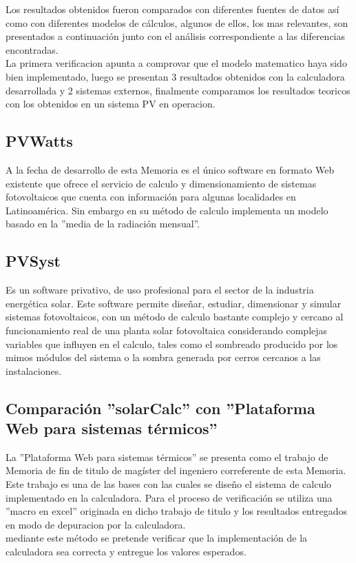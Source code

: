 Los resultados obtenidos fueron comparados con diferentes fuentes de datos así como con diferentes modelos de cálculos, algunos de ellos, los mas relevantes, son presentados a continuación junto con el análisis correspondiente a las diferencias encontradas.\\
La primera verificacion apunta a comprovar que el modelo matematico haya sido bien implementado, luego se presentan 3 resultados obtenidos con la calculadora desarrollada y 2 sistemas externos, finalmente comparamos los resultados teoricos con los obtenidos en un sistema PV en operacion.\\

\subsection{PVWatts}
A la fecha de desarrollo de esta Memoria es el único software en formato Web existente que ofrece el servicio de calculo y dimensionamiento de sistemas fotovoltaicos que cuenta con información para algunas localidades en Latinoamérica. Sin embargo en su método de calculo implementa un modelo basado en la ''media de la radiación mensual''.\\ 
\subsection{PVSyst}
Es un software privativo, de uso profesional para el sector de la industria energética solar. Este software permite diseñar, estudiar, dimensionar y simular sistemas fotovoltaicos, con un método de calculo bastante complejo y cercano al funcionamiento real de una planta solar fotovoltaica considerando complejas variables que influyen en el calculo, tales como el sombreado producido por los mimos módulos del sistema o la sombra generada por cerros cercanos a las instalaciones.\\
\subsection{}

\subsection{Comparación ''solarCalc'' con ''Plataforma Web para sistemas térmicos''}
La ''Plataforma Web para sistemas térmicos'' se presenta como el trabajo de Memoria de fin de titulo de magíster del ingeniero correferente de esta Memoria\cite{memoriaEdo}. Este trabajo es una de las bases con las cuales se diseño el sistema de calculo implementado en la calculadora. Para el proceso de verificación se utiliza una ''macro en excel'' originada en dicho trabajo de titulo y los resultados entregados en modo de depuracion por la calculadora.\\
mediante este método se pretende verificar que la implementación de la calculadora sea correcta y entregue los valores esperados.

